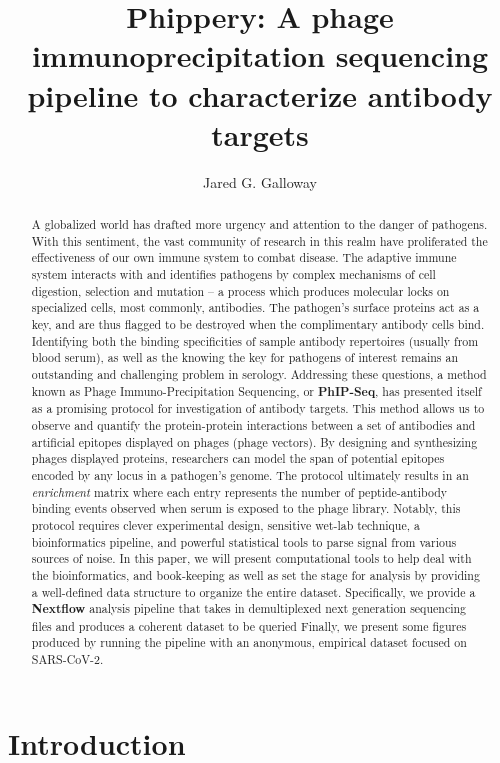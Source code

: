 \documentclass{article}
\title{Phippery: A phage immunoprecipitation sequencing pipeline to characterize antibody targets}
\author{Jared G. Galloway}
\begin{document}
\maketitle

\begin{abstract}
A globalized world has drafted more urgency and attention to the danger of pathogens.
With this sentiment, the vast community of research in this realm have proliferated the effectiveness of our own immune system to combat disease.
The adaptive immune system interacts with and identifies pathogens by complex mechanisms of cell digestion, selection and mutation --
a process which produces molecular locks on specialized cells, most commonly, antibodies.
The pathogen's surface proteins act as a key, and are thus flagged to be destroyed when the complimentary antibody cells bind.
Identifying both the binding specificities of sample antibody repertoires (usually from blood serum), as well as the knowing the key for pathogens of interest remains an outstanding and challenging problem in serology. 
Addressing these questions, a method known as Phage Immuno-Precipitation Sequencing, or \textbf{PhIP-Seq}, has presented itself as a promising protocol for investigation of antibody targets.
This method allows us to observe and quantify the protein-protein interactions between a set of antibodies and artificial epitopes displayed on phages (phage vectors).
By designing and synthesizing phages displayed proteins, researchers can model the span of potential epitopes encoded by any locus in a pathogen's genome.
The protocol ultimately results in an \textit{enrichment} matrix where each entry represents the number of peptide-antibody binding events observed when serum is exposed to the phage library.
Notably, this protocol requires clever experimental design, sensitive wet-lab technique, a bioinformatics pipeline, and powerful statistical tools to parse signal from various sources of noise.
In this paper, we will present computational tools to help deal with the bioinformatics, and book-keeping as well as set the stage for analysis by providing a well-defined data structure to organize the entire dataset.
Specifically, we provide a \textbf{Nextflow} analysis pipeline that takes in demultiplexed next generation sequencing files and produces a coherent dataset to be queried
Finally, we present some figures produced by running the pipeline with an anonymous, empirical dataset focused on SARS-CoV-2.
\end{abstract}

\section*{Introduction}
\end{document}
